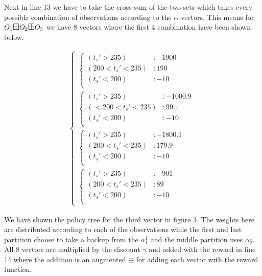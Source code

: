 \documentclass{article}
\begin{document}
Next in line 13 we have to take the cross-sum of the two sets which takes every possible combination of observations according to the $\alpha$-vectors. This means for $O_1 \textrm{\large $\boxplus$} O_2 \textrm{\large $\boxplus$} O_3$ we have 8 vectors where the first 4 combination  have been shown below: 

\begin{align*}
\begin{cases}
\begin{cases}
(t_s'>235) &: -1900 \\
(200<t_s'<235) &: 190 \\
(t_s'<200) &: -10 \\
\end{cases}
\\
\begin{cases}
(t_s'>235) &: -1000.9 \\
(<200<t_s'<235) &: 99.1 \\
(t_s'<200) &: -10 \\
\end{cases}
\\
\begin{cases}
 (t_s'>235) &: -1800.1 \\
 (200<t_s'<235) &: 179.9 \\
 (t_s'<200) &: -10 \\
\end{cases}
\\
\begin{cases}
 (t_s'>235) &: -901 \\
 (200<t_s'<235) &: 89 \\
 (t_s'<200) &: -10 \\
\end{cases}
\end{cases}
\end{align*}

We have shown the policy tree for the third vector in figure 3. The weights here are distributed according to each of the observations while the first and last partition choose to take a backup from the $\alpha_1^1$ and the middle partition uses $\alpha_2^1$. 
All 8 vectors are multiplied by the discount $\gamma$ and added with the reward in line 14 where the addition is an augmented $\oplus$ for adding each vector with the reward function. 
\end{document}
